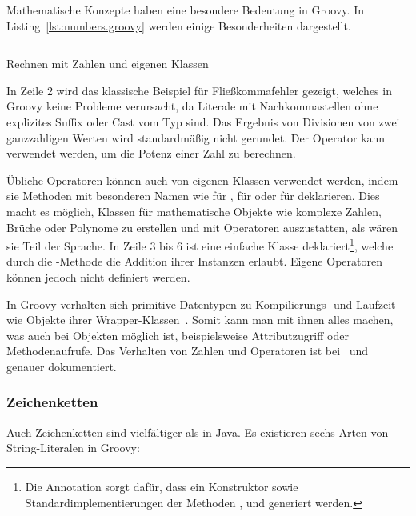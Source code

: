 \documentclass[a4paper]{article}
\newcommand{\codelisting}[3]{
\begin{listing}[ht]
	\inputminted{#1}{#1/#2}
	\vspace{-3ex}
	\caption{#3}
	\label{lst:#2}
\end{listing}
}
\begin{document}
Mathematische Konzepte haben eine besondere Bedeutung in Groovy.
In Listing~\ref{lst:numbers.groovy} werden einige Besonderheiten dargestellt.

\codelisting{groovy}{numbers.groovy}{Rechnen mit Zahlen und eigenen Klassen}

In Zeile 2 wird das klassische Beispiel für Fließkommafehler gezeigt, welches in Groovy keine Probleme verursacht, da Literale mit Nachkommastellen ohne explizites Suffix oder Cast vom Typ  sind.
Das Ergebnis von Divisionen von zwei ganzzahligen Werten wird standardmäßig nicht gerundet.
Der Operator \code{**} kann verwendet werden, um die Potenz einer Zahl zu berechnen.

Übliche Operatoren können auch von eigenen Klassen verwendet werden, indem sie Methoden mit besonderen Namen wie  für \code{+},  für \code{<<} oder  für \code{++} deklarieren.
Dies macht es möglich, Klassen für mathematische Objekte wie komplexe Zahlen, Brüche oder Polynome zu erstellen und mit Operatoren auszustatten, als wären sie Teil der Sprache.
In Zeile 3 bis 6 ist eine einfache Klasse  deklariert\footnote{Die Annotation  sorgt dafür, dass ein Konstruktor sowie Standardimplementierungen der Methoden ,  und  generiert werden.}, welche durch die -Methode die Addition ihrer Instanzen erlaubt.
Eigene Operatoren können jedoch nicht definiert werden.

In Groovy verhalten sich primitive Datentypen zu Kompilierungs- und Laufzeit wie Objekte ihrer Wrapper-Klassen~\cite[Abs.~10.]{groovy-lang:differences}.
Somit kann man mit ihnen alles machen, was auch bei Objekten möglich ist, beispielsweise Attributzugriff oder Methodenaufrufe.
Das Verhalten von Zahlen und Operatoren ist bei~\cite[Abs.~5.]{groovy-lang:syntax} und ~\cite[Abs.~10.]{groovy-lang:operators} genauer dokumentiert.

\subsubsection{Zeichenketten}\label{subsubsec:strings}

Auch Zeichenketten sind vielfältiger als in Java.
Es existieren sechs Arten von String-Literalen in Groovy:
\end{document}
